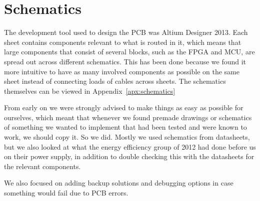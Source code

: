 
\section{Schematics}

The development tool used to design the PCB was Altium Designer 2013. Each sheet
contains components relevant to what is routed in it, which means that large
components that consist of several blocks, such as the FPGA and MCU, are spread
out across different schematics. This has been done because we found it more
intuitive to have as many involved components as possible on the same sheet
instead of connecting loads of cables across sheets. The schematics themselves
can be viewed in Appendix~\ref{apx:schematics} 

From early on we were strongly advised to make things as easy as possible for
ourselves, which meant that whenever we found premade drawings or schematics of
something we wanted to implement that had been tested and were known to work, we
should copy it. So we did. Mostly we used schematics from datasheets, but we
also looked at what the energy efficiency group of 2012 had done before us on
their power supply, in addition to double checking this with the datasheets for
the relevant components.

We also focused on adding backup solutions and debugging options in case
something would fail due to PCB errors.

